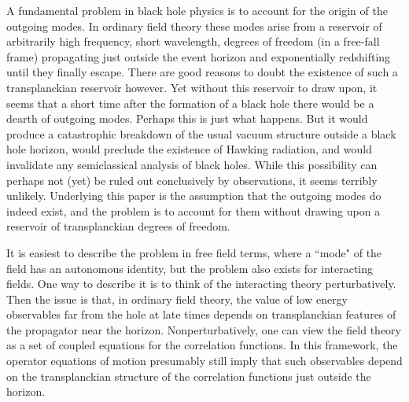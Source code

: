A fundamental problem in black hole physics is to account for the
origin of the outgoing modes. In ordinary field theory these modes
arise from a reservoir of arbitrarily high frequency, short wavelength,
degrees of freedom (in a free-fall frame) propagating just outside the
event horizon and exponentially redshifting until they finally escape.
There are good reasons to doubt the existence of such a transplanckian
reservoir however.  Yet without this reservoir to draw upon, it seems
that a short time after the formation of a black hole there would be a
dearth of outgoing modes\cite{Jaco1}. Perhaps this is just what
happens.  But it would produce a catastrophic breakdown of the usual
vacuum structure outside a black hole horizon, would preclude the
existence of Hawking radiation, and would invalidate any semiclassical
analysis of black holes.  While this possibility can perhaps not (yet)
be ruled out conclusively by observations, it seems terribly unlikely.
Underlying this paper is the assumption that the outgoing modes do
indeed exist, and the problem is to account for them without drawing
upon a reservoir of transplanckian degrees of freedom.

It is easiest to describe the problem in free field terms, where a
``mode" of the field has an autonomous identity, but the problem also
exists for interacting fields. One way to describe it is to think of
the interacting theory perturbatively. Then the issue is that, in
ordinary field theory, the value of low energy observables far from the
hole at late times depends on transplanckian features of the propagator
near the horizon\cite{FredHaag}.  Nonperturbatively, one can view the
field theory as a set of coupled equations for the correlation
functions. In this framework, the operator equations of motion
presumably still imply that such observables depend on the
transplanckian structure of the correlation functions just outside the
horizon.

